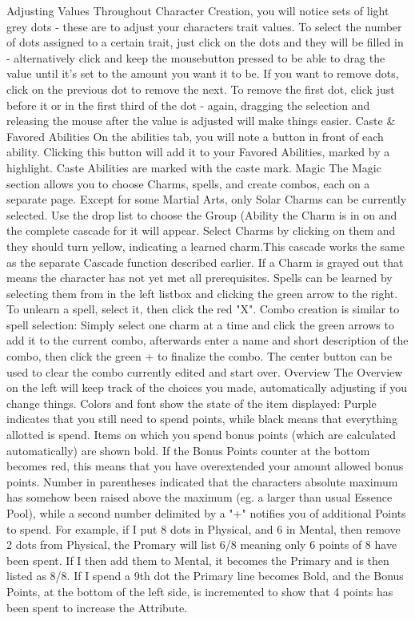 Adjusting Values
Throughout Character Creation, you will notice sets of light grey dots - these are to adjust your characters trait values. To select the number of dots assigned to a certain trait, just click on the dots and they will be filled in - alternatively click and keep the mousebutton pressed to be able to drag the value until it's set to the amount you want it to be.
If you want to remove dots, click on the previous dot to remove the next. To remove the first dot, click just before it or in the first third of the dot - again, dragging the selection and releasing the mouse after the value is adjusted will make things easier.
Caste \& Favored Abilities
On the abilities tab, you will note a button in front of each ability. Clicking this button will add it to your Favored Abilities, marked by a highlight.
Caste Abilities are marked with the caste mark.
Magic
The Magic section allows you to choose Charms, spells, and create combos, each on a separate page. Except for some Martial Arts, only Solar Charms can be currently selected. Use the drop list to choose the Group (Ability the Charm is in on and the complete cascade for it will appear. Select Charms by clicking on them and they should turn yellow, indicating a learned charm.This cascade works the same as the separate Cascade function described earlier.
If a Charm is grayed out that means the character has not yet met all prerequisites.
Spells can be learned by selecting them from in the left listbox and clicking the green arrow to the right. To unlearn a spell, select it, then click the red "X".
Combo creation is similar to spell selection: Simply select one charm at a time and click the green arrows to add it to the current combo, afterwards enter a name and short description of the combo, then click the green + to finalize the combo. The center button can be used to clear the combo currently edited and start over.
Overview
The Overview on the left will keep track of the choices you made, automatically adjusting if you change things. Colors and font show the state of the item displayed:
Purple indicates that you still need to spend points, while black means that everything allotted is spend. Items on which you spend bonus points (which are calculated automatically) are shown bold. If the Bonus Points counter at the bottom becomes red, this means that you have overextended your amount allowed bonus points.
Number in parentheses indicated that the characters absolute maximum has somehow been raised above the maximum (eg. a larger than usual Essence Pool), while a second number delimited by a "+" notifies you of additional Points to spend.
For example, if I put 8 dots in Physical, and 6 in Mental, then remove 2 dots from Physical, the Promary will list 6/8 meaning only 6 points of 8 have been spent. If I then add them to Mental, it becomes the Primary and is then listed as 8/8. If I spend a 9th dot the Primary line becomes Bold, and the Bonus Points, at the bottom of the left side, is incremented to show that 4 points has been spent to increase the Attribute.

